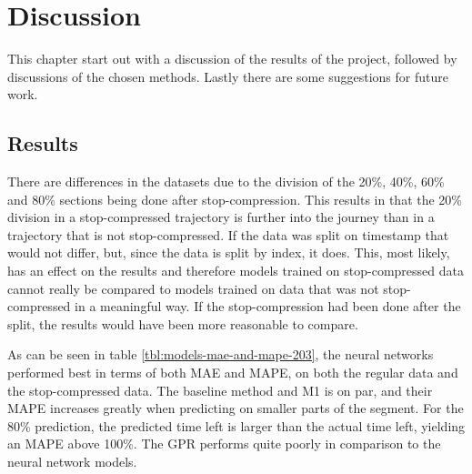
\chapter{Discussion}
\label{cha:discussion}

This chapter start out with a discussion of the results of the project, followed by discussions of the chosen methods. Lastly there are some suggestions for future work.

\section{Results}
\label{sec:discussion-results} 
There are differences in the datasets due to the division of the 20\%, 40\%, 60\% and 80\% sections being done after stop-compression. This results in that the 20\% division in a stop-compressed trajectory is further into the journey than in a trajectory that is not stop-compressed. If the data was split on timestamp that would not differ, but, since the data is split by index, it does. This, most likely, has an effect on the results and therefore models trained on stop-compressed data cannot really be compared to models trained on data that was not stop-compressed in a meaningful way. If the stop-compression had been done after the split, the results would have been more reasonable to compare.

As can be seen in table \ref{tbl:models-mae-and-mape-203}, the neural networks performed best in terms of both MAE and MAPE, on both the regular data and the stop-compressed data. The baseline method and M1 is on par, and their MAPE increases greatly when predicting on smaller parts of the segment. For the 80\% prediction, the predicted time left is larger than the actual time left, yielding an MAPE above 100\%. The GPR performs quite poorly in comparison to the neural network models.

